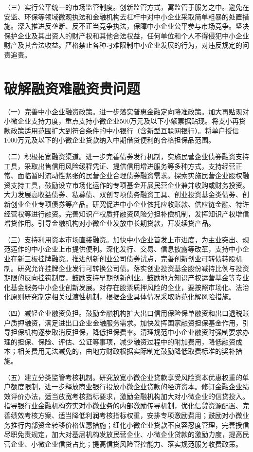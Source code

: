 （三）实行公平统一的市场监管制度。创新监管方式，寓监管于服务之中。避免在安监、环保等领域微观执法和金融机构去杠杆中对中小企业采取简单粗暴的处置措施。深入推进反垄断、反不正当竞争执法，保障中小企业公平参与市场竞争。坚决保护企业及其出资人的财产权和其他合法权益，任何单位和个人不得侵犯中小企业财产及其合法收益。严格禁止各种刁难限制中小企业发展的行为，对违反规定的问责追责。

\section{破解融资难融资贵问题}

（一）完善中小企业融资政策。进一步落实普惠金融定向降准政策。加大再贴现对小微企业支持力度，重点支持小微企业500万元及以下小额票据贴现。将支小再贷款政策适用范围扩大到符合条件的中小银行（含新型互联网银行）。将单户授信1000万元及以下的小微企业贷款纳入中期借贷便利的合格担保品范围。

（二）积极拓宽融资渠道。进一步完善债券发行机制，实施民营企业债券融资支持工具，采取出售信用风险缓释凭证、提供信用增进服务等多种方式，支持经营正常、面临暂时流动性紧张的民营企业合理债券融资需求。探索实施民营企业股权融资支持工具，鼓励设立市场化运作的专项基金开展民营企业兼并收购或财务投资。大力发展高收益债券、私募债、双创专项债务融资工具、创业投资基金类债券、创新创业企业专项债券等产品。研究促进中小企业依托应收账款、供应链金融、特许经营权等进行融资。完善知识产权质押融资风险分担补偿机制，发挥知识产权增信增贷作用。引导金融机构对小微企业发放中长期贷款，开发续贷产品。

（三）支持利用资本市场直接融资。加快中小企业首发上市进度，为主业突出、规范运作的中小企业上市提供便利。深化发行、交易、信息披露等改革，支持中小企业在新三板挂牌融资。推进创新创业公司债券试点，完善创新创业可转债转股机制。研究允许挂牌企业发行可转换公司债。落实创业投资基金股份减持比例与投资期限的反向挂钩制度，鼓励支持早期创新创业。鼓励地方知识产权运营基金等专业化基金服务中小企业创新发展。对存在股票质押风险的企业，要按照市场化、法治化原则研究制定相关过渡性机制，根据企业具体情况采取防范化解风险措施。

（四）减轻企业融资负担。鼓励金融机构扩大出口信用保险保单融资和出口退税账户质押融资，满足进出口企业金融服务需求。加快发挥国家融资担保基金作用，引导担保机构逐步取消反担保，降低担保费率。清理规范中小企业融资时强制要求办理的担保、保险、评估、公证等事项，减少融资过程中的附加费用，降低融资成本；相关费用无法减免的，由地方财政根据实际制定鼓励降低取费标准的奖补措施。

（五）建立分类监管考核机制。研究放宽小微企业贷款享受风险资本优惠权重的单户额度限制，进一步释放商业银行投放小微企业贷款的经济资本。修订金融企业绩效评价办法，适当放宽考核指标要求，激励金融机构加大对小微企业的信贷投入。指导银行业金融机构夯实对小微业务的内部激励传导机制，优化信贷资源配置、完善绩效考核方案、适当降低利润考核指标权重，安排专项激励费用；鼓励对小微业务推行内部资金转移价格优惠措施；细化小微企业贷款不良容忍度管理，完善授信尽职免责规定，加大对基层机构发放民营企业、小微企业贷款的激励力度，提高民营企业、小微企业信贷占比；提高信贷风险管控能力、落实规范服务收费政策。

